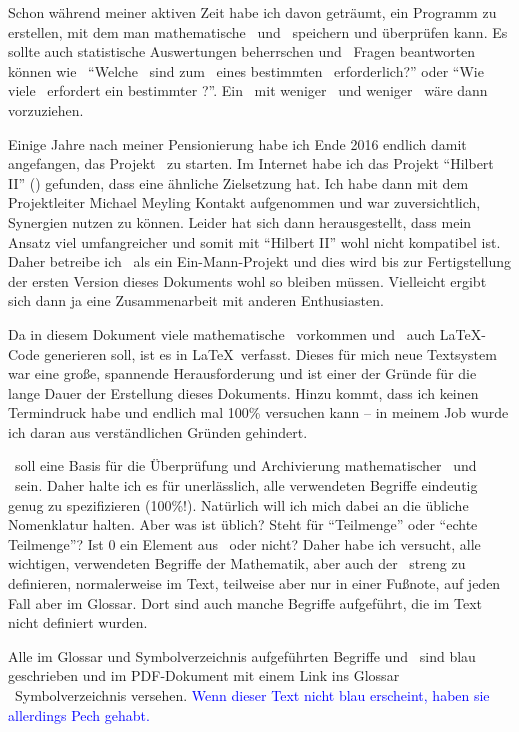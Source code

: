 Schon während meiner aktiven Zeit habe ich davon geträumt, ein Programm zu erstellen, mit dem man mathematische \Saetze\ und \Beweise\ speichern und überprüfen kann.
Es sollte auch statistische Auswertungen beherrschen und \textua\ Fragen beantworten können wie \textzB\
"`Welche \Axiome\ sind zum \Beweis\ eines bestimmten \Satzes\ erforderlich?"' oder
"`Wie viele \Beweisschritte\ erfordert ein bestimmter \Beweis?"'.
Ein \Beweis\ mit weniger \Axiomen\ und weniger \Beweisschritten\ wäre dann vorzuziehen.

Einige Jahre nach meiner Pensionierung habe ich Ende 2016 endlich damit angefangen, das Projekt \ASBA\ zu starten.
Im Internet habe ich das Projekt "`Hilbert II"' (\cite{bib:HilbertII}) gefunden, dass eine ähnliche Zielsetzung hat.
Ich habe dann mit dem Projektleiter Michael Meyling Kontakt aufgenommen und war zuversichtlich, Synergien nutzen zu können.
Leider hat sich dann herausgestellt, dass mein Ansatz viel umfangreicher und somit mit "`Hilbert II"' wohl nicht kompatibel ist.
Daher betreibe ich \ASBA\ als ein Ein-Mann-Projekt und dies wird bis zur Fertigstellung der ersten Version dieses Dokuments wohl so bleiben müssen.
Vielleicht ergibt sich dann ja eine Zusammenarbeit mit anderen Enthusiasten.

Da in diesem Dokument viele mathematische \Formeln\ vorkommen und \ASBA\ auch \LaTeX-Code generieren soll, ist es in \LaTeX\ verfasst.
Dieses für mich neue Textsystem war eine große, spannende Herausforderung und ist einer der Gründe für die lange Dauer der Erstellung dieses Dokuments.
Hinzu kommt, dass ich keinen Termindruck habe und endlich mal 100\% versuchen kann -- in meinem Job wurde ich daran aus verständlichen Gründen gehindert.

\ASBA\ soll eine Basis für die Überprüfung und Archivierung mathematischer \Saetze\ und \Beweise\ sein.
Daher halte ich es für unerlässlich, alle verwendeten Begriffe eindeutig genug zu spezifizieren (100\%!).
Natürlich will ich mich dabei an die übliche Nomenklatur halten.
Aber was ist üblich?
Steht \chrqt{\MtsSubset} für "`Teilmenge"' oder "`echte Teilmenge"'?
Ist $0$ ein Element aus \MtsIN\ oder nicht?
Daher habe ich versucht, alle wichtigen, verwendeten Begriffe der Mathematik, aber auch der \formalisiertenMetasprache\ streng zu definieren, normalerweise im Text, teilweise aber nur in einer Fußnote, auf jeden Fall aber im Glossar.
Dort sind auch manche Begriffe aufgeführt, die im Text nicht definiert wurden.

Alle im Glossar und Symbolverzeichnis aufgeführten Begriffe und \Symbole\ sind blau geschrieben und im PDF-Dokument mit einem Link ins Glossar \textbzw\ Symbolverzeichnis versehen.
\textcolor{blue}{Wenn dieser Text nicht blau erscheint, haben sie allerdings Pech gehabt.}

